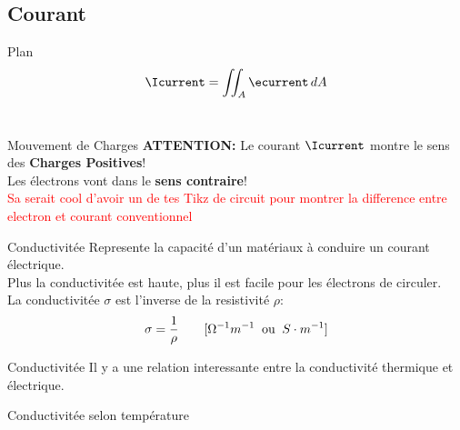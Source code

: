 \subsection[2min - Max]{Courant}
\maxbackground
\begin{frame}{Plan}
    \begin{equation}
        \Icurrent = \iint_A \ecurrent \,dA
    \end{equation}\\
    \vspace{20pt}
\end{frame}


\begin{frame}{Mouvement de Charges}
    \centering
    \icon{\faExclamationTriangle} \textbf{ATTENTION:} Le courant $\Icurrent$ montre le sens des \textbf{Charges Positives}!\\
    Les électrons vont dans le \textbf{sens contraire}!\\
    \vspace{20pt}
    \textcolor{red}{Sa serait cool d'avoir un de tes Tikz de circuit pour montrer la difference entre electron et courant conventionnel}
\end{frame}

\begin{frame}{Conductivitée}
    \centering
    \icon{\faExchange*} Represente la capacité d'un matériaux à conduire un courant électrique.\\
    Plus la conductivitée est haute, plus il est facile pour les électrons de circuler.\\
    \vspace{30pt}
    La conductivitée \textbf{$\sigma$} est l'inverse de la resistivité \textbf{$\rho$}:
    \begin{equation}
        \sigma = \frac{1}{\rho} \hspace{2.0em} [\Omega^{-1} m^{-1} \;\;\text{ou}\;\; S\cdot m^{-1}]
    \end{equation}
\end{frame}

\begin{frame}{Conductivitée}
    \centering
    \icon[red]{\faThermometerThreeQuarters} Il y a une relation interessante entre la conductivité thermique et électrique.
\end{frame}

\begin{frame}{Conductivitée selon température}
\end{frame}

